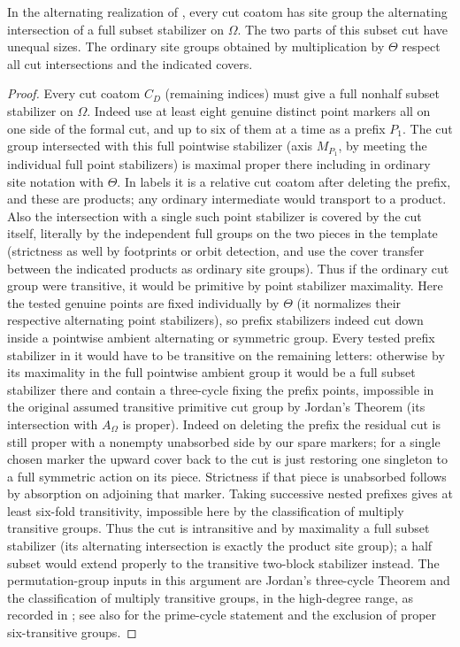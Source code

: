 \begin{lemma}\label{t:weighted-cuts}
In the alternating realization of , every cut
coatom has site group the alternating intersection of a full subset
stabilizer on \(\Omega\).  The two parts of this subset cut have unequal
sizes.  The ordinary site groups obtained by multiplication by \(\Theta\)
respect all cut intersections and the indicated covers.
\end{lemma}
\begin{proof}
Every cut coatom \(C_D\) (remaining indices) must give a full nonhalf subset stabilizer on
\(\Omega\). Indeed use at least eight genuine distinct point markers all on one side of the formal
cut, and up to six of them at a time as a prefix \(P_1\). The cut group intersected with this full
pointwise stabilizer (axis \(M_{P_1}\), by meeting the individual full point stabilizers) is
maximal proper there including in ordinary site notation with \(\Theta\). In labels it is a
relative cut coatom after deleting the prefix, and these are products; any ordinary intermediate
would transport to a product. Also the intersection with a single such point stabilizer is covered
by the cut itself, literally by the independent full groups on the two pieces in the template
(strictness as well by footprints or orbit detection, and use the cover transfer between the
indicated products as ordinary site groups). Thus if the ordinary cut group were transitive, it
would be primitive by point stabilizer maximality. Here the tested genuine points are fixed
individually by \(\Theta\) (it normalizes their respective alternating point stabilizers), so
prefix stabilizers indeed cut down inside a pointwise ambient alternating or symmetric group.
Every tested prefix stabilizer in it would have to be transitive on the remaining letters:
otherwise by its maximality in the full pointwise ambient group it would be a full subset
stabilizer there and contain a three-cycle fixing the prefix points, impossible in the original
assumed transitive primitive cut group by Jordan's Theorem (its intersection with \(A_\Omega\) is
proper). Indeed on deleting the prefix the residual cut is still proper with a nonempty unabsorbed
side by our spare markers; for a single chosen marker the upward cover back to the cut is just
restoring one singleton to a full symmetric action on its piece. Strictness if that piece is
unabsorbed follows by absorption on adjoining that marker. Taking successive nested prefixes gives
at least six-fold transitivity, impossible here by the classification of multiply transitive
groups. Thus the cut is intransitive and by maximality a full subset stabilizer (its alternating
intersection is exactly the product site group); a half subset would extend properly to the
transitive two-block stabilizer instead.
The permutation-group inputs in this argument are Jordan's three-cycle
Theorem and the classification of multiply transitive groups, in the
high-degree range, as recorded in ; see also
\citet[Theorem~1.1 and Section~2]{Jones2014} for the prime-cycle
statement and the exclusion of proper six-transitive groups.
\end{proof}

